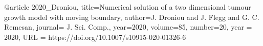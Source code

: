 @article{
      2020_Droniou,
	title={Numerical solution of a two dimensional tumour growth model with moving boundary},
	author={J. Droniou and J. Flegg and G. C. Remesan},
	journal= {J. Sci. Comp.},
	year={2020},
	volume={85},
	number={20},
	year = {2020},
	URL = {https://doi.org/10.1007/s10915-020-01326-6}
}